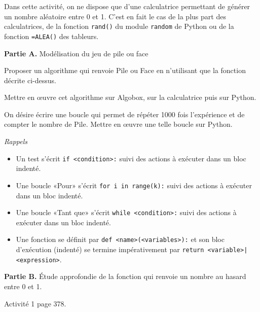 \documentclass[12pt,a4paper,french]{article}
\begin{document}
Dans cette activité, on ne dispose que d'une calculatrice permettant de
générer un nombre aléatoire entre 0 et 1. C'est en fait le cas de la
plus part des calculatrices, de la fonction \texttt{rand()} du module
\texttt{random} de Python ou de la fonction \texttt{=ALEA()} des
tableurs.

\textbf{Partie A.} Modélisation du jeu de pile ou face

Proposer un algorithme qui renvoie Pile ou Face en n'utilisant que la
fonction décrite ci-dessus.

Mettre en œuvre cet algorithme sur Algobox, sur la calculatrice puis sur
Python.

On désire écrire une boucle qui permet de répéter 1000 fois l'expérience
et de compter le nombre de Pile. Mettre en œuvre une telle boucle sur
Python.

\emph{Rappels}
\begin{itemize}
  \item Un test s'écrit \texttt{if <condition>:} suivi des actions à
    exécuter dans un bloc indenté.
  \item Une boucle «Pour» s'écrit \texttt{for i in range(k):} suivi des
    actions à exécuter dans un bloc indenté.
  \item Une boucle «Tant que» s'écrit \texttt{while <condition>:} suivi
    des actions à exécuter dans un bloc indenté.
  \item Une fonction se définit par \texttt{def <name>(<variables>):} et
    son bloc d'exécution (indenté) se termine impérativement par
    \texttt{return <variable>|<expression>}.
\end{itemize}

\textbf{Partie B.} Étude approfondie de la fonction qui renvoie un
nombre au hasard entre 0 et 1.

Activité 1 page 378.
\end{document}
